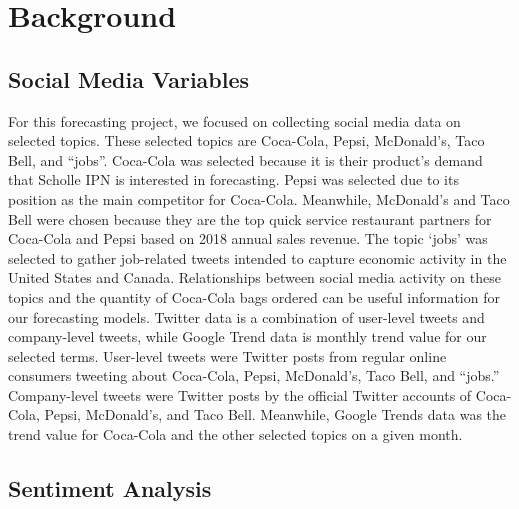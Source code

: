 \documentclass[12pt,oneside]{chicagocapstone}
\begin{document}
\hypertarget{background}{%
\chapter*{Background}\label{background}}

\hypertarget{social-media-variables}{%
\section*{Social Media Variables}\label{social-media-variables}}

For this forecasting project, we focused on collecting social media data on selected topics. These selected topics are Coca-Cola, Pepsi, McDonald's, Taco Bell, and ``jobs''. Coca-Cola was selected because it is their product's demand that Scholle IPN is interested in forecasting. Pepsi was selected due to its position as the main competitor for Coca-Cola. Meanwhile, McDonald's and Taco Bell were chosen because they are the top quick service restaurant partners for Coca-Cola and Pepsi based on 2018 annual sales revenue. The topic `jobs' was selected to gather job-related tweets intended to capture economic activity in the United States and Canada. Relationships between social media activity on these topics and the quantity of Coca-Cola bags ordered can be useful information for our forecasting models.
Twitter data is a combination of user-level tweets and company-level tweets, while Google Trend data is monthly trend value for our selected terms. User-level tweets were Twitter posts from regular online consumers tweeting about Coca-Cola, Pepsi, McDonald's, Taco Bell, and ``jobs.'' Company-level tweets were Twitter posts by the official Twitter accounts of Coca-Cola, Pepsi, McDonald's, and Taco Bell. Meanwhile, Google Trends data was the trend value for Coca-Cola and the other selected topics on a given month.

\hypertarget{sentiment-analysis}{%
\section*{Sentiment Analysis}\label{sentiment-analysis}}
\end{document}
